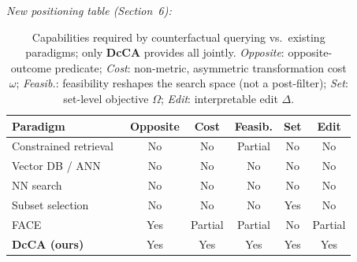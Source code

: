 \noindent\emph{New positioning table (Section~6):}
\begin{table}[h]
\centering\footnotesize
\setlength{\tabcolsep}{4pt}
\caption{Capabilities required by counterfactual querying vs.\ existing paradigms; only \textbf{DcCA} provides all jointly. \emph{Opposite}: opposite-outcome predicate; \emph{Cost}: non-metric, asymmetric transformation cost $\omega$; \emph{Feasib.}: feasibility reshapes the search space (not a post-filter); \emph{Set}: set-level objective $\Omega$; \emph{Edit}: interpretable edit $\Delta$.}
\label{tab:positioning}
\begin{tabular}{@{}lccccc@{}}
\toprule
Paradigm & Opposite & Cost & Feasib. & Set & Edit \\
\midrule
Constrained retrieval~\cite{lee2019constraint}      & No  & No      & Partial & No  & No \\
Vector DB / ANN~\cite{pgvector,malkov2018efficient} & No  & No      & No      & No  & No \\
NN search~\cite{indyk1998approximate}               & No  & No      & No      & No  & No \\
Subset selection~\cite{borodin2017max}              & No  & No      & No      & Yes & No \\
FACE~\cite{poyiadzi2020face}                        & Yes & Partial & Partial & No  & Partial \\
\textbf{DcCA (ours)}                                & Yes & Yes     & Yes     & Yes & Yes \\
\bottomrule
\end{tabular}
\end{table}
